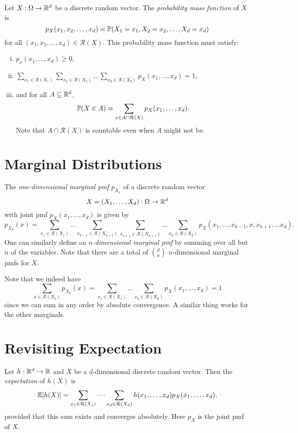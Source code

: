 \begin{definition}
  Let $X : \Omega \to \mathbb{R}^d$ be a discrete random
  vector. The \emph{probability mass function} of $X$
  is
  \[
    p_X(x_1, x_2, \dots, x_d) = \mathbb{P}(X_1 = x_1, X_2 = x_2, \dots, X_d = x_d)
  \]
  for all $(x_1, x_2, \dots, x_d) \in \mathcal{R}(X)$.
  This probability mass function must satisfy:
  \begin{enumerate}[(i)]
    \item $p_x(x_1, \dots, x_d) \ge 0$,
    \item $\displaystyle \sum_{x_1 \in \mathcal{R}(X_1)} \sum_{x_2 \in \mathcal{R}(X_2)} \dots \sum_{x_d \in \mathcal{R}(X_d)} p_X(x_1, \dots, x_d) = 1$,
    \item and for all $A \subseteq \mathbb{R}^d$,
      \[
        \mathbb{P}(X \in A)
        = \sum_{x \in A \cap \mathcal{R}(X)}
        p_X(x_1, \dots, x_d).
      \]
      Note that $A \cap \mathcal{R}(X)$ is countable
      even when $A$ might not be.
  \end{enumerate}
\end{definition}

\section{Marginal Distributions}
\begin{definition}
  The \emph{one-dimensional marginal pmf}
  $p_{X_k}$
  of a discrete random vector
  \[X = (X_1, \dots, X_d) : \Omega \to \mathbb{R}^d\]
  with joint pmf $p_X(x_1, \dots, x_d)$
  is given by
  \[
    p_{X_k}(x) = \sum_{x_1 \in \mathcal{R}(X_1)} \dots \sum_{x_{k-1} \in \mathcal{R}(X_{k-1})} \sum_{x_{k+1} \in \mathcal{R}(X_{k+1})} \dots \sum_{x_d \in \mathcal{R}(X_d)} p_X(x_1, \dots, x_{k - 1}, x, x_{k + 1}, \dots x_d).
  \]
  One can similarly define an \emph{$n$-dimensional marginal pmf}
  by summing over all but $n$ of the variables.
  Note that there are a total of $\binom{d}{n}$
  $n$-dimensional marginal pmfs for $X$.
\end{definition}

\begin{remark}
  Note that we indeed have
  \[
    \sum_{x \in \mathcal{R}(X_k)} p_{X_k}(x)
    = \sum_{x_1 \in \mathcal{R}(X_1)} \dots \sum_{x_d \in \mathcal{R}(X_d)} p_X(x_1, \dots, x_d)
    = 1
  \]
  since we can sum in any order by absolute
  convergence. A similar thing works for
  the other marginals.
\end{remark}

\section{Revisiting Expectation}
\begin{definition}
  Let $h : \mathbb{R}^d \to \mathbb{R}$ and $X$ be a $d$-dimensional
  discrete random vector. Then the \emph{expectation} of
  $h(X)$ is
  \[
    \mathbb{E}[h(X)]
    = \sum_{x_1 \in \mathcal{R}(X_1)} \dots \sum_{x_d \in \mathcal{R}(X_d)} h(x_1, \dots, x_d) p_X(x_1, \dots, x_d),
  \]
  provided that this sum exists and
  converges absolutely. Here $p_X$ is the joint
  pmf of $X$.
\end{definition}

